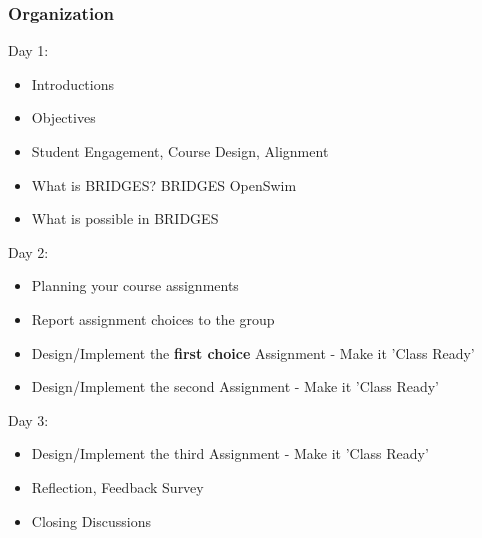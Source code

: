 \documentclass[aspectratio=169]{beamer}
\begin{document}
\begin{frame}
  \frametitle{Organization}

  Day 1:
  \begin{itemize}
  \item Introductions
  \item Objectives
  \item Student Engagement, Course Design, Alignment
  \item What is BRIDGES? BRIDGES OpenSwim
  \item What is possible in BRIDGES
  \end{itemize}
  
  Day 2:
  \begin{itemize}
  \item Planning your course assignments
  \item Report assignment choices to the group
  \item Design/Implement the \textbf{first choice} Assignment - 
		Make it 'Class Ready'
  \item Design/Implement the second Assignment - Make it 'Class Ready' 
  \end{itemize}

  Day 3:
  \begin{itemize}
  \item Design/Implement the third Assignment - Make it 'Class Ready'
  \item Reflection, Feedback Survey
  \item Closing Discussions
  \end{itemize}
  
\end{frame}
\end{document}
